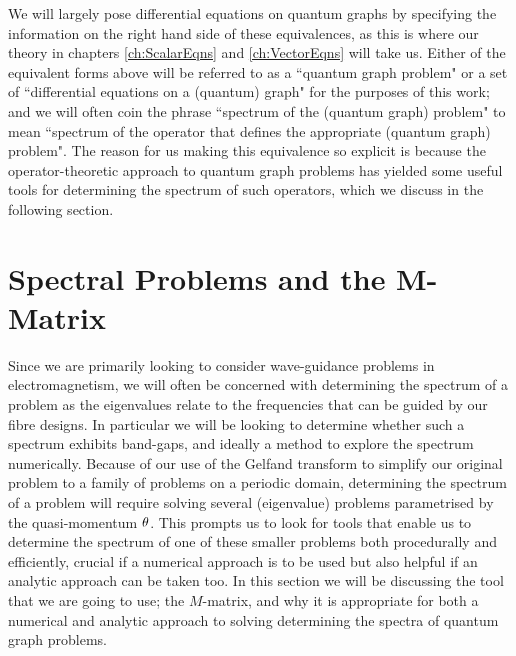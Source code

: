 We will largely pose differential equations on quantum graphs by specifying the information on the right hand side of these equivalences, as this is where our theory in chapters \ref{ch:ScalarEqns} and \ref{ch:VectorEqns} will take us.
Either of the equivalent forms above will be referred to as a ``quantum graph problem" or a set of ``differential equations on a (quantum) graph" for the purposes of this work; and we will often coin the phrase ``spectrum of the (quantum graph) problem" to mean ``spectrum of the operator that defines the appropriate (quantum graph) problem".
The reason for us making this equivalence so explicit is because the operator-theoretic approach to quantum graph problems has yielded some useful tools for determining the spectrum of such operators, which we discuss in the following section.

\section{Spectral Problems and the M-Matrix} \label{sec:M-MatrixTheory}
Since we are primarily looking to consider wave-guidance problems in electromagnetism, we will often be concerned with determining the spectrum of a problem as the eigenvalues relate to the frequencies that can be guided by our fibre designs.
In particular we will be looking to determine whether such a spectrum exhibits band-gaps, and ideally a method to explore the spectrum numerically.
Because of our use of the Gelfand transform  to simplify our original problem to a family of problems on a periodic domain, determining the spectrum of a problem will require solving several (eigenvalue) problems parametrised by the quasi-momentum $\theta$.
This prompts us to look for tools that enable us to determine the spectrum of one of these smaller problems both procedurally and efficiently, crucial if a numerical approach is to be used but also helpful if an analytic approach can be taken too.
In this section we will be discussing the tool that we are going to use; the $M$-matrix, and why it is appropriate for both a numerical and analytic approach to solving determining the spectra of quantum graph problems. \newline

